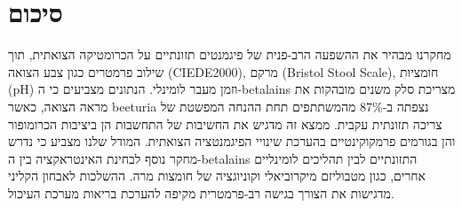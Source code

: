 \section{\texthebrew{סיכום}}

\begin{hebrew}מחקרנו מבהיר את ההשפעה הרב-פנית של פיגמנטים תזונתיים על הכרומטיקה הצואתית, תוך שילוב פרמטרים כגון צבע הצואה (\textenglish{CIEDE2000}), מרקם (\textenglish{Bristol Stool Scale}), חומציות (\textenglish{pH}) וזמן מעבר לומינלי. הנתונים מצביעים כי ה-\textenglish{betalains} מצריכת סלק משנים מובהקות את מראה הצואה, כאשר \textenglish{beeturia} נצפתה ב-87\% מהמשתתפים תחת ההנחה המפשטת של צריכה תזונתית עקבית. ממצא זה מדגיש את החשיבות של התחשבות הן ביציבות הכרומופור והן בגורמים פרמקוקינטיים בהערכת שינויי הפיגמנטציה הצואתית. המודל שלנו מצביע כי נדרש מחקר נוסף לבחינת האינטראקציה בין ה-\textenglish{betalains} התזונתיים לבין תהליכים לומינליים אחרים, כגון מטבוליזם מיקרוביאלי וקוניוגציה של חומצות מרה. ההשלכות לאבחון הקליני מדגישות את הצורך בגישה רב-פרמטרית מקיפה להערכת בריאות מערכת העיכול.\end{hebrew}